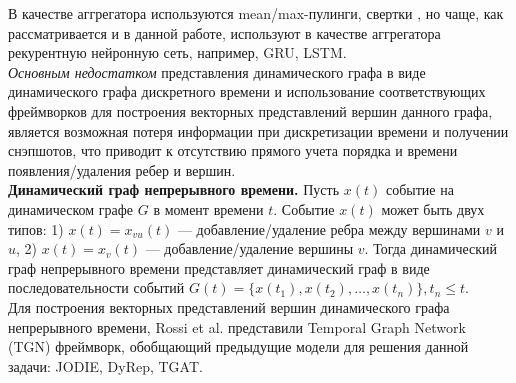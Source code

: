 \documentclass[a4paper,14pt,oneside]{mipt-thesis-ms}
\renewcommand{\leq}{\leqslant}  %
\begin{document}
В качестве аггрегатора используются mean/max-пулинги, свертки \cite{yu01, liu01, fathy01}, но чаще, как рассматривается и в данной работе, используют в качестве аггрегатора рекурентную нейронную сеть\cite{seo01, manessi01, li01, zhao01}, например, GRU, LSTM.\\

{\it Основным недостатком} представления динамического графа в виде динамического графа дискретного времени и использование соответствующих фреймворков для построения векторных представлений вершин данного графа, является возможная потеря информации при дискретизации времени и получении снэпшотов, что приводит к отсутствию прямого учета порядка и времени появления/удаления ребер и вершин.\\

{\bf Динамический граф непрерывного времени.} Пусть $x(t)$ событие на динамическом графе $G$ в момент времени $t$. Событие $x(t)$ может быть двух типов: 1) $x(t) = x_{vu}(t)$ --- добавление/удаление ребра между вершинами $v$ и $u$, 2) $x(t) = x_v(t)$ --- добавление/удаление вершины $v$. Тогда динамический граф непрерывного времени представляет динамический граф в виде последовательности событий $G(t) = \{x(t_1), x(t_2), \dots, x(t_n)\}, t_n \leq t$.\cite{rossi01}\\

Для построения векторных представлений вершин динамического графа непрерывного времени, Rossi et al. представили Temporal Graph Network (TGN) фреймворк\cite{rossi01}, обобщающий предыдущие модели для решения данной задачи: JODIE\cite{kumar01}, DyRep\cite{trivedi01}, TGAT\cite{xu01}.\\
\end{document}
